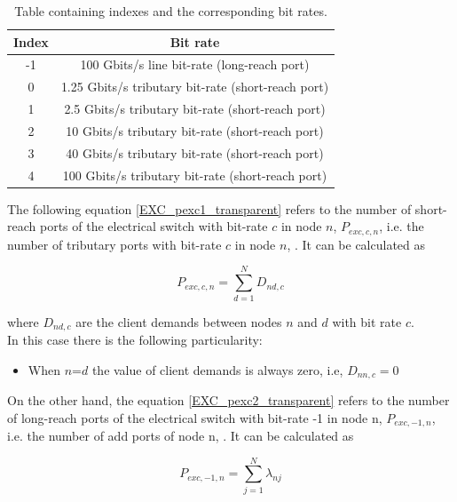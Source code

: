 \begin{table}[h!]
\centering
\begin{tabular}{|c|c|}
  \hline
  Index & Bit rate \\
 \hline
  -1 & 100 Gbits/s line bit-rate (long-reach port) \\
  0 & 1.25 Gbits/s tributary bit-rate (short-reach port) \\
  1 & 2.5 Gbits/s tributary bit-rate (short-reach port) \\
  2 & 10 Gbits/s tributary bit-rate (short-reach port) \\
  3 & 40 Gbits/s tributary bit-rate (short-reach port) \\
  4 & 100 Gbits/s tributary bit-rate (short-reach port) \\
  \hline
\end{tabular}
\caption{Table containing indexes and the corresponding bit rates.}
\label{table_bitrate}
\end{table}


The following equation \ref{EXC_pexc1_transparent} refers to the number of short-reach ports of the electrical switch with bit-rate $c$ in node $n$, $P_{exc,c,n}$, i.e. the number of tributary ports with bit-rate $c$ in node $n$, \cite{TiagoEsteves}. It can be calculated as

\begin{equation}
P_{exc,c,n} = \sum_{d=1}^{N} D_{nd,c}
\label{EXC_pexc1_transparent}
\end{equation}

\noindent
where $D_{nd,c}$ are the client demands between nodes $n$ and $d$ with bit rate $c$.\\

In this case there is the following particularity:
\begin{itemize}
  \item When $n$=$d$ the value of client demands is always zero, i.e, $D_{nn,c}=0$
\end{itemize}

On the other hand, the equation \ref{EXC_pexc2_transparent} refers to the number of long-reach ports of the electrical switch with bit-rate -1 in node n, $P_{exc,-1,n}$, i.e. the number of add ports of node n, \cite{TiagoEsteves}. It can be calculated as

\begin{equation}
P_{exc,-1,n} = \sum_{j=1}^{N} \lambda_{nj}
\label{EXC_pexc2_transparent}
\end{equation}

